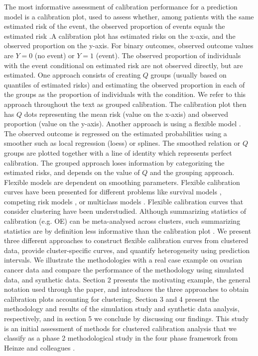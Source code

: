 The most informative assessment of calibration performance for a prediction model is a calibration plot, used to assess whether, among patients with the same estimated risk of the event, the observed proportion of events equals the estimated risk \cite{vancalsterCalibrationHierarchyRisk2016,vancalsterPerformanceEvaluationPredictive2024}.A calibration plot has estimated risks on the x-axis, and the observed proportion on the y-axis. For binary outcomes, observed outcome values are \(Y = 0\) (no event) or \(Y = 1\) (event). The observed proportion of individuals with the event conditional on estimated risk are not observed directly, but are estimated. One approach consists of creating \(Q\) groups (usually based on quantiles of estimated risks) and estimating the observed proportion in each of the groups as the proportion of individuals with the condition. We refer to this approach throughout the text as grouped calibration. The calibration plot then has \(Q\) dots representing the mean risk (value on the x-axis) and observed proportion (value on the y-axis). Another approach is using a flexible model \cite{austinGraphicalAssessmentInternal2014}. The observed outcome is regressed on the estimated probabilities using a smoother such as local regression (loess) or splines. The smoothed relation or \(Q\) groups are plotted together with a line of identity which represents perfect calibration. The grouped approach loses information by categorizing the estimated risks, and depends on the value of \(Q\) and the grouping approach. Flexible models are dependent on smoothing parameters. Flexible calibration curves have been presented for different problems like survival models \cite{austinGraphicalCalibrationCurves2020}, competing risk models \cite{austinGraphicalCalibrationCurves2022}, or multiclass models \cite{vanhoordeSplinebasedToolAssess2015}. Flexible calibration curves that consider clustering have been understudied. Although summarizing statistics of calibration (e.g. \gls{OE}) can be meta-analysed across clusters, such summarizing statistics are by definition less informative than the calibration plot \cite{vancalsterPerformanceEvaluationPredictive2024,debrayGuideSystematicReview2017}. We present three different approaches to construct flexible calibration curves from clustered data, provide cluster-specific curves, and quantify heterogeneity using prediction intervals. We illustrate the methodologies with a real case example on ovarian cancer data and compare the performance of the methodology using simulated data, and synthetic data. Section 2 presents the motivating example, the general notation used through the paper, and introduces the three approaches to obtain calibration plots accounting for clustering. Section 3 and 4 present the methodology and results of the simulation study and synthetic data analysis, respectively, and in section 5 we conclude by discussing our findings. This study is an initial assessment of methods for clustered calibration analysis that we classify as a phase 2 methodological study in the four phase framework from Heinze and colleagues \cite{heinzePhasesMethodologicalResearch2024}.

